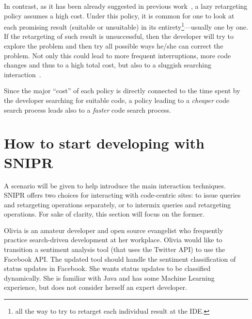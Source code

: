 In contrast, as it has been already suggested in previous work~\cite{Brandt:2009ew, Wightman:2012gc}, a lazy retargeting policy assumes a high cost. Under this policy, it is common for one to look at each promising result (suitable or unsuitable) in its entirety\footnote{all the way to try to retarget each individual result at the IDE.}---usually one by one. If the retargeting of such result is unsuccessful, then the developer will try to explore the problem and then try all possible ways he/she can correct the problem. Not only this could lead to more frequent interruptions, more code changes and thus to a high total cost, but also to a sluggish searching interaction~\cite{Gray:2000im}.

Since the major ``cost'' of each policy is directly connected to the time spent by the developer searching for suitable code, a policy leading to a \emph{cheaper} code search process leads also to a \emph{faster} code search process.

% 
% 
% 


\section{How to start developing with \uppercase{SnipR}}
\label{sec:sniprscenario}

A scenario will be given to help introduce the main interaction techniques. \uppercase{SnipR} offers two choices for interacting with code-centric sites: to issue queries and retargeting operations separately, or to intermix queries and retargeting operations. For sake of clarity, this section will focus on the former.

Olivia is an amateur developer and open source evangelist who frequently practice search-driven development at her workplace. Olivia would like to transition a sentiment analysis tool (that uses the Twitter API) to use the Facebook API. The updated tool should handle the sentiment classification of status updates in Facebook. She wants status updates to be classified dynamically. She is familiar with Java and has some Machine Learning experience, but does not consider herself an expert developer.

